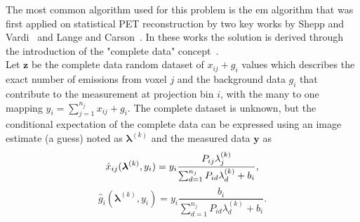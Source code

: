 The most common algorithm used for this problem is the \gls{em} algorithm that was first applied on statistical PET reconstruction by two key works by Shepp and Vardi~\cite{Vardi1985} and Lange and Carson~\cite{Lange1984}. In these works the solution is derived through the introduction of the "complete data" concept~\cite{Dempster1977}. \\
Let $\bm{z}$ be the complete data random dataset of $x_{ij} + g_i$ values which describes the exact number of emissions from voxel $j$ and the background data $g_i$ that contribute to the measurement at projection bin $i$, with the many to one mapping 
\mbox{$y_i = \sum_{j=1}^{n_j} x_{ij} + g_i$}.
The complete dataset is unknown, but the conditional expectation of the complete data can be expressed using an image estimate (a guess) noted as $\bm{\lambda}^{(k)}$ and the measured data $\bm{y}$ as 
%
\begin{equation}
\label{eq:Complete_Data_Expectation1}
\hat{x}_{ij}(\bm{\lambda}^{(k)},y_i) = y_i
\frac{P_{ij} \lambda_j^{(k)}}{\sum_{d=1}^{n_j} P_{id}\lambda_d^{(k)} + b_i} \\ , 
\end{equation}
%
\begin{equation}
\label{eq:Complete_Data_Expectation2}
\hat{g}_{i}(\bm{\lambda}^{(k)},y_i) = y_i 
\frac{b_i}{\sum_{d=1}^{n_j} P_{id}\lambda_d^{(k)} + b_i} . 
\end{equation}
%

